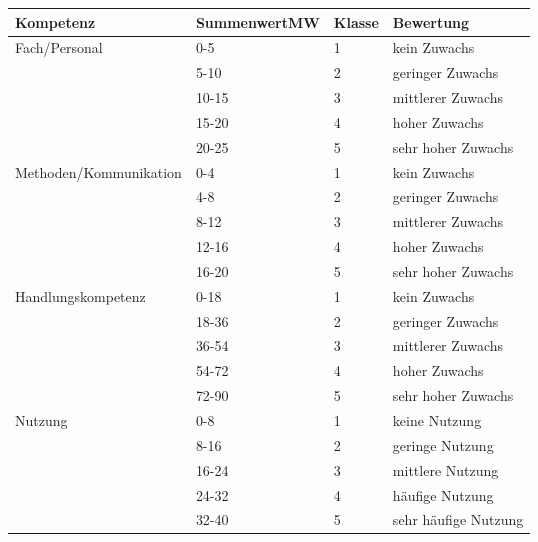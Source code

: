\begin{table}[H]
\centering
\begin{tabular}{@{}llll@{}}
\toprule
Kompetenz              & SummenwertMW & Klasse & Bewertung          \\ \midrule
Fach/Personal          & 0-5        & 1      & kein Zuwachs       \\
                       & 5-10       & 2      & geringer Zuwachs   \\
                       & 10-15      & 3      & mittlerer Zuwachs  \\
                       & 15-20      & 4      & hoher Zuwachs      \\
                       & 20-25      & 5      & sehr hoher Zuwachs \\ \cmidrule(r){1-4}
Methoden/Kommunikation & 0-4        & 1      & kein Zuwachs       \\
                       & 4-8        & 2      & geringer Zuwachs   \\
                       & 8-12       & 3      & mittlerer Zuwachs  \\
                       & 12-16      & 4      & hoher Zuwachs      \\
                       & 16-20      & 5      & sehr hoher Zuwachs \\ 
                       \cmidrule(r){1-4}
Handlungskompetenz 	& 0-18       & 1      & kein Zuwachs       \\
                       & 18-36        & 2      & geringer Zuwachs   \\
                       & 36-54       & 3      & mittlerer Zuwachs  \\
                       & 54-72      & 4      & hoher Zuwachs      \\
                       & 72-90      & 5      & sehr hoher Zuwachs \\ 
                       \cmidrule(r){1-4}
Nutzung	& 0-8       & 1      & keine Nutzung       \\
                       & 8-16        & 2      & geringe Nutzung   \\
                       & 16-24       & 3      & mittlere Nutzung  \\
                       & 24-32     & 4      & häufige Nutzung      \\
                       & 32-40      & 5      & sehr häufige Nutzung \\ 
                       \bottomrule
\end{tabular}
\end{table}
